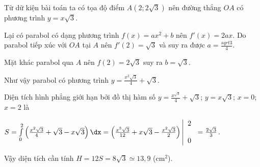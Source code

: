 \begin{ex}
{        Từ dữ kiện bài toán ta có tọa độ điểm $A(2;2\sqrt{3})$ nên đường thẳng $OA$ có phương trình $y=x\sqrt{3}$.
        
        Lại có parabol có dạng phương trình $f(x)=ax^{2}+b$ nên $f'(x)=2ax$. Do parabol tiếp xúc với $OA$ tại $A$ nên $f'(2)=\sqrt{3}$ và suy ra được $a=\frac{sqrt{3}}{4}$.
        
        Mặt khác parabol qua $A$ nên $f(2)=2\sqrt{3}$ suy ra $b=\sqrt{3}$.
        
        Như vậy parabol có phương trình $y=\frac{x^{2}\sqrt{3}}{4}+\sqrt{3}$.
        
        Diện tích hình phẳng giới hạn bởi đồ thị hàm số $y=\frac{x^{\sqrt{3}}}{4}+\sqrt{3}$; $y=x\sqrt{3}$; $x=0$; $x=2$ là 
        
        $S=\int\limits_{0}^{2}\left(\frac{x^{2}\sqrt{3}}{4}+\sqrt{3}-x\sqrt{3}\right)\dx=\left(\frac{x^{3}\sqrt{3}}{12}+x\sqrt{3}-\frac{x^{2}\sqrt{3}}{2}\right)\left|\begin{array}{l}2 \\ \\ 0\end{array}\right.=\frac{2\sqrt{3}}{3}$.
        
        Vậy diện tích cần tính $H=12S=8\sqrt{3}\simeq 13,9$  (cm$^{2}$).
    }
\end{ex}


